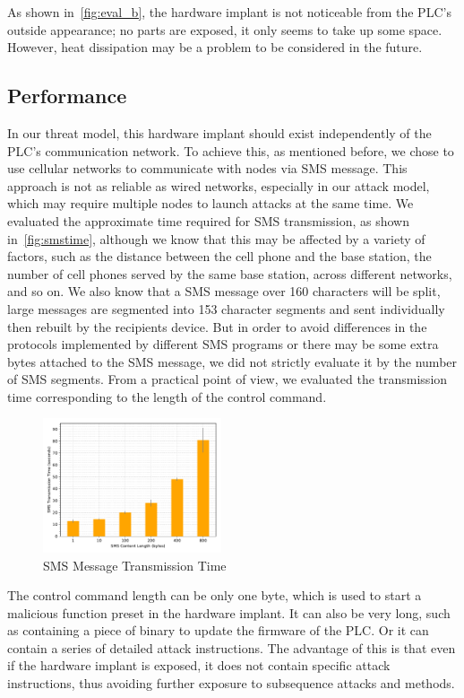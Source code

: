 As shown in~\autoref{fig:eval_b}, the hardware implant is not noticeable from the PLC's outside appearance; no parts are exposed, it only seems to take up some space. However, heat dissipation may be a problem to be considered in the future.

\subsection{Performance}

In our threat model, this hardware implant should exist independently of the PLC's communication network. To achieve this, as mentioned before, we chose to use cellular networks to communicate with nodes via SMS message. This approach is not as reliable as wired networks, especially in our attack model, which may require multiple nodes to launch attacks at the same time. We evaluated the approximate time required for SMS transmission, as shown in~\autoref{fig:smstime}, although we know that this may be affected by a variety of factors, such as the distance between the cell phone and the base station, the number of cell phones served by the same base station, across different networks, and so on. We also know that a SMS message over 160 characters will be split, large messages are segmented into 153 character segments and sent individually then rebuilt by the recipients device. But in order to avoid differences in the protocols implemented by different SMS programs or there may be some extra bytes attached to the SMS message, we did not strictly evaluate it by the number of SMS segments. From a practical point of view, we evaluated the transmission time corresponding to the length of the control command.

\begin{figure}[th]
	\includegraphics[width=0.47\textwidth]{figures/smstime}
	\centering
	\caption{SMS Message Transmission Time}
	\label{fig:smstime}
\end{figure}

The control command length can be only one byte, which is used to start a malicious function preset in the hardware implant. It can also be very long, such as containing a piece of binary to update the firmware of the PLC. Or it can contain a series of detailed attack instructions. The advantage of this is that even if the hardware implant is exposed, it does not contain specific attack instructions, thus avoiding further exposure to subsequence attacks and methods.


